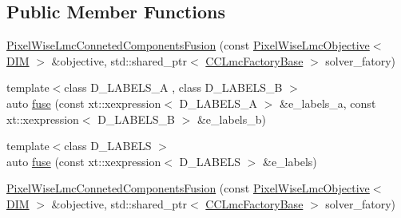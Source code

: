 \subsection*{Public Member Functions}
\begin{DoxyCompactItemize}
\item 
\hyperlink{classnifty_1_1graph_1_1opt_1_1lifted__multicut_1_1PixelWiseLmcConnetedComponentsFusion_3_012_01_4_a92433c7064b9b236e84d5f9de3a3d177}{Pixel\+Wise\+Lmc\+Conneted\+Components\+Fusion} (const \hyperlink{classnifty_1_1graph_1_1opt_1_1lifted__multicut_1_1PixelWiseLmcObjective}{Pixel\+Wise\+Lmc\+Objective}$<$ \hyperlink{classnifty_1_1graph_1_1opt_1_1lifted__multicut_1_1PixelWiseLmcConnetedComponentsFusion_3_012_01_4_aa53357c01823259e7ac1216f1211a531}{D\+IM} $>$ \&objective, std\+::shared\+\_\+ptr$<$ \hyperlink{classnifty_1_1graph_1_1opt_1_1lifted__multicut_1_1PixelWiseLmcConnetedComponentsFusion_3_012_01_4_ab4ad143cd3473408280088a97d5680c5}{C\+C\+Lmc\+Factory\+Base} $>$ solver\+\_\+fatory)
\item 
{\footnotesize template$<$class D\+\_\+\+L\+A\+B\+E\+L\+S\+\_\+A , class D\+\_\+\+L\+A\+B\+E\+L\+S\+\_\+B $>$ }\\auto \hyperlink{classnifty_1_1graph_1_1opt_1_1lifted__multicut_1_1PixelWiseLmcConnetedComponentsFusion_3_012_01_4_a474eb36f28a8e5053b8779f03524a74e}{fuse} (const xt\+::xexpression$<$ D\+\_\+\+L\+A\+B\+E\+L\+S\+\_\+A $>$ \&e\+\_\+labels\+\_\+a, const xt\+::xexpression$<$ D\+\_\+\+L\+A\+B\+E\+L\+S\+\_\+B $>$ \&e\+\_\+labels\+\_\+b)
\item 
{\footnotesize template$<$class D\+\_\+\+L\+A\+B\+E\+LS $>$ }\\auto \hyperlink{classnifty_1_1graph_1_1opt_1_1lifted__multicut_1_1PixelWiseLmcConnetedComponentsFusion_3_012_01_4_af4cb1b970e31478a1a9d608dc0433ba6}{fuse} (const xt\+::xexpression$<$ D\+\_\+\+L\+A\+B\+E\+LS $>$ \&e\+\_\+labels)
\item 
\hyperlink{classnifty_1_1graph_1_1opt_1_1lifted__multicut_1_1PixelWiseLmcConnetedComponentsFusion_3_012_01_4_a92433c7064b9b236e84d5f9de3a3d177}{Pixel\+Wise\+Lmc\+Conneted\+Components\+Fusion} (const \hyperlink{classnifty_1_1graph_1_1opt_1_1lifted__multicut_1_1PixelWiseLmcObjective}{Pixel\+Wise\+Lmc\+Objective}$<$ \hyperlink{classnifty_1_1graph_1_1opt_1_1lifted__multicut_1_1PixelWiseLmcConnetedComponentsFusion_3_012_01_4_aa53357c01823259e7ac1216f1211a531}{D\+IM} $>$ \&objective, std\+::shared\+\_\+ptr$<$ \hyperlink{classnifty_1_1graph_1_1opt_1_1lifted__multicut_1_1PixelWiseLmcConnetedComponentsFusion_3_012_01_4_ab4ad143cd3473408280088a97d5680c5}{C\+C\+Lmc\+Factory\+Base} $>$ solver\+\_\+fatory)

\end{DoxyCompactItemize}
